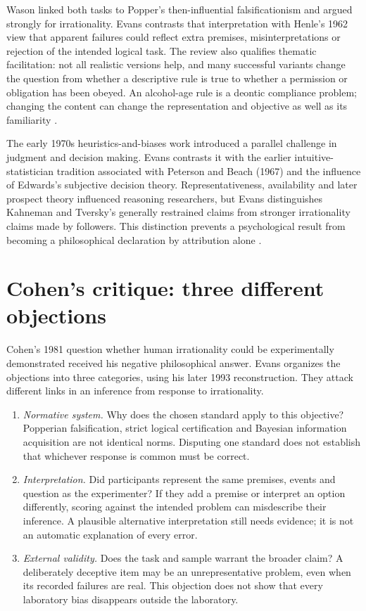 Wason linked both tasks to Popper's then-influential falsificationism and
argued strongly for irrationality.  Evans contrasts that interpretation with
Henle's 1962 view that apparent failures could reflect extra premises,
misinterpretations or rejection of the intended logical task.  The review
also qualifies thematic facilitation: not all realistic versions help, and
many successful variants change the question from whether a descriptive rule
is true to whether a permission or obligation has been obeyed.  An alcohol-age
rule is a deontic compliance problem; changing the content can change the
representation and objective as well as its familiarity
\parencite[pp.~89--90]{Evans2021RationalityDebate}.

The early 1970s heuristics-and-biases work introduced a parallel challenge in
judgment and decision making.  Evans contrasts it with the earlier intuitive-
statistician tradition associated with Peterson and Beach (1967) and the
influence of Edwards's subjective decision theory.  Representativeness,
availability and later prospect theory influenced reasoning researchers,
but Evans distinguishes Kahneman and Tversky's generally restrained claims
from stronger irrationality claims made by followers.  This distinction
prevents a psychological result from becoming a philosophical declaration
by attribution alone \parencite[pp.~90--91]{Evans2021RationalityDebate}.

\section{Cohen's critique: three different objections}
\label{sec:p13-r12-interpretation}

Cohen's 1981 question whether human irrationality could be experimentally
demonstrated received his negative philosophical answer.  Evans organizes
the objections into three categories, using his later 1993 reconstruction.
They attack different links in an inference from response to irrationality.

\begin{enumerate}
 \item \emph{Normative system.} Why does the chosen standard apply to this
       objective?  Popperian falsification, strict logical certification and
       Bayesian information acquisition are not identical norms.  Disputing
       one standard does not establish that whichever response is common
       must be correct.
 \item \emph{Interpretation.} Did participants represent the same premises,
       events and question as the experimenter?  If they add a premise or
       interpret an option differently, scoring against the intended problem
       can misdescribe their inference.  A plausible alternative interpretation
       still needs evidence; it is not an automatic explanation of every error.
 \item \emph{External validity.} Does the task and sample warrant the broader
       claim?  A deliberately deceptive item may be an unrepresentative
       problem, even when its recorded failures are real.  This objection
       does not show that every laboratory bias disappears outside the laboratory.
\end{enumerate}

